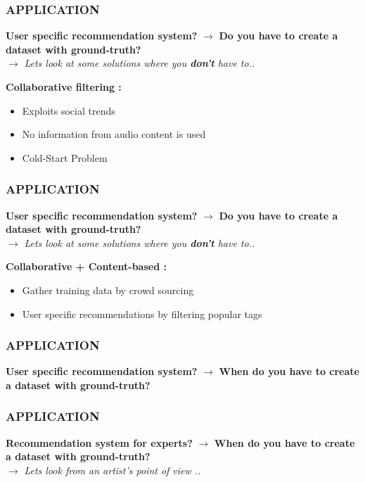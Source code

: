 \documentclass{beamer}
\begin{document}
\begin{frame}
\frametitle{APPLICATION}
\begin{block}{\textbf{User specific recommendation system?}}
$\mathbf{\rightarrow}$ \textbf{Do you have to create a dataset with ground-truth?}\\
\pause
\qquad $\mathbf{\rightarrow}$ \textit{Lets look at some solutions where you \textbf{don't} have to..}

\end{block}
\bigskip

\textbf{Collaborative filtering :}
\begin{itemize}
\item {\color<2>[RGB]{0,100,0}Exploits social trends}
\item {No information from audio content is used}
\item {\color{red} Cold-Start Problem}
\end{itemize}
\end{frame}

\begin{frame}
\frametitle{APPLICATION}
\begin{block}{\textbf{User specific recommendation system?}}
$\mathbf{\rightarrow}$ \textbf{Do you have to create a dataset with ground-truth?}\\
\qquad $\mathbf{\rightarrow}$ \textit{Lets look at some solutions where you \textbf{don't} have to..}
\end{block}
\bigskip

\textbf{Collaborative + Content-based :}
\begin{itemize}
\item {Gather training data by crowd sourcing}
\item {User specific recommendations by filtering popular tags}
\end{itemize}
\end{frame}

\begin{frame}
\frametitle{APPLICATION}
\begin{block}{\textbf{User specific recommendation system?}}
$\mathbf{\rightarrow}$ \textbf{{\color{red} When} do you have to create a dataset with ground-truth?}
\end{block}
\end{frame}

\begin{frame}
\frametitle{APPLICATION}
\begin{block}{\textbf{Recommendation system for {\color{green} experts}?}}
$\mathbf{\rightarrow}$ \textbf{{\color{red} When} do you have to create a dataset with ground-truth?}\\
\qquad $\mathbf{\rightarrow}$ \textit{Lets look from an artist's point of view ..}

\end{block}
\end{frame}
\end{document}
